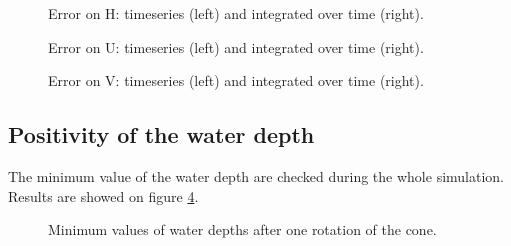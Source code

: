 \begin{figure}[H]
\begin{minipage}[t]{0.45\textwidth}
 \centering
\end{minipage}%
\begin{minipage}[t]{0.55\textwidth}
 \centering
\end{minipage}
  \caption{Error on H: timeseries (left) and integrated over time (right).}
  \label{fig:stoker:ErrNumH}
\end{figure}

\begin{figure}[H]
\begin{minipage}[t]{0.45\textwidth}
 \centering
\end{minipage}%
\begin{minipage}[t]{0.55\textwidth}
 \centering
\end{minipage}
  \caption{Error on U: timeseries (left) and integrated over time (right).}
  \label{fig:stoker:ErrNumU}
\end{figure}

\begin{figure}[H]
\begin{minipage}[t]{0.45\textwidth}
 \centering
\end{minipage}%
\begin{minipage}[t]{0.55\textwidth}
 \centering
\end{minipage}
  \caption{Error on V: timeseries (left) and integrated over time (right).}
  \label{fig:stoker:ErrNumV}
\end{figure}

\subsection{Positivity of the water depth}

The minimum value of the water depth are checked during the whole simulation.
Results are showed on figure \ref{t2d:stoker:minmax}.

\begin{figure}[H]
\centering
{}
\caption{Minimum values of water depths after one rotation of the cone.}
\label{t2d:stoker:minmax}
\end{figure}

